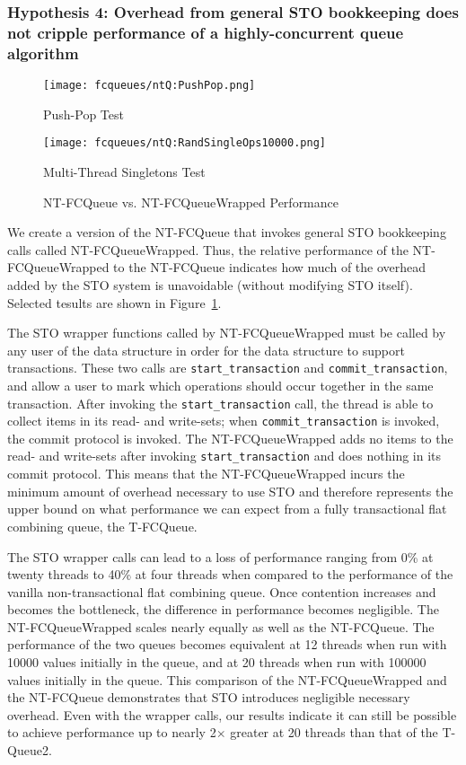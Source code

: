 \subsubsection{Hypothesis 4: Overhead from general STO bookkeeping does not cripple performance of a highly-concurrent queue algorithm}

\begin{figure}[t]
    \centering
	\begin{minipage}{0.45\textwidth}
	    \texttt{[image: fcqueues/ntQ:PushPop.png]}
        \caption*{Push-Pop Test}
	\end{minipage}
   	\begin{minipage}{0.45\textwidth}
	    \texttt{[image: fcqueues/ntQ:RandSingleOps10000.png]}
        \caption*{Multi-Thread Singletons Test}
	\end{minipage}
        \caption{NT-FCQueue vs. NT-FCQueueWrapped Performance}
    \label{fig:wrappedqs}
\end{figure}

We create a version of the NT-FCQueue that invokes general STO bookkeeping calls called NT-FCQueueWrapped. Thus, the relative performance of the NT-FCQueueWrapped to the NT-FCQueue indicates how much of the overhead added by the STO system is unavoidable (without modifying STO itself). 
Selected tesults are shown in Figure~\ref{fig:wrappedqs}.

The STO wrapper functions called by NT-FCQueueWrapped must be called by any user of the data structure in order for the data structure to support transactions.
These two calls are \texttt{start\_transaction} and \texttt{commit\_transaction}, and allow a user to mark which operations should occur together in the same transaction. After invoking the \texttt{start\_transaction} call, the thread is able to collect items in its read- and write-sets; when \texttt{commit\_transaction} is invoked, the commit protocol is invoked. The NT-FCQueueWrapped adds no items to the read- and write-sets after invoking \texttt{start\_transaction} and does nothing in its commit protocol. This means that the NT-FCQueueWrapped incurs the minimum amount of overhead necessary to use STO and therefore represents the upper bound on what performance we can expect from a fully transactional flat combining queue, the T-FCQueue. 

The STO wrapper calls can lead to a loss of performance ranging from 0\% at twenty threads to 40\% at four threads when compared to the performance of the vanilla non-transactional flat combining queue. Once contention increases and becomes the bottleneck, the difference in performance becomes negligible. The NT-FCQueueWrapped scales nearly equally as well as the NT-FCQueue. The performance of the two queues becomes equivalent at 12 threads when run with 10000 values initially in the queue, and at 20 threads when run with 100000 values initially in the queue. This comparison of the NT-FCQueueWrapped and the NT-FCQueue demonstrates that STO introduces negligible necessary overhead. Even with the wrapper calls, our results indicate it can still be possible to achieve performance up to nearly 2$\times$ greater at 20 threads than that of the T-Queue2.

